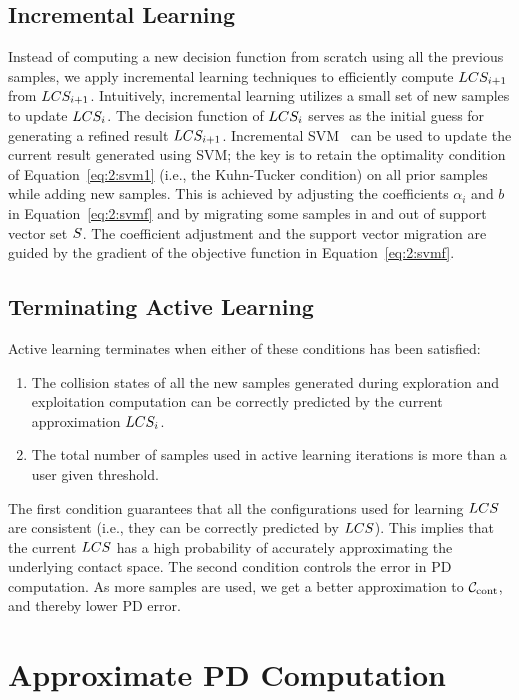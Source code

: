 \subsection{Incremental Learning}
\label{sec:2:incremental_learning}
Instead of computing a new decision function
from scratch using all the previous samples, we apply incremental
learning techniques to efficiently compute $LCS_{i+1}$ from
$LCS_{i+1}$. Intuitively, incremental learning utilizes a small set
of new samples to update $LCS_i$. The decision function of $LCS_i$
serves as the initial guess for generating a refined result
$LCS_{i+1}$. Incremental SVM~\cite{Karasuyama:2009:MID} can be used to update
the current result generated using SVM; the key is to retain the optimality condition of Equation~\ref{eq:2:svm1} (i.e., the Kuhn-Tucker condition) on all prior samples while adding new samples. This is achieved by adjusting the coefficients $\alpha_i$ and $b$ in Equation~\ref{eq:2:svmf} and by migrating some samples
in and out of support vector set $S$. The coefficient adjustment and the support vector migration are guided by the gradient of the objective function in Equation~\ref{eq:2:svmf}.

\subsection{Terminating Active Learning}
Active learning terminates when either of these conditions has been satisfied:
\begin{enumerate}
    \item The collision states of all the new samples generated during
exploration and exploitation computation can be correctly predicted by the
current approximation $LCS_i$.
    \item The total number of samples used in active learning iterations is more than a user given threshold.
   \end{enumerate}
The first condition guarantees that all the configurations used for learning $LCS$ are consistent (i.e., they can be correctly predicted by $LCS$). This implies that the current $LCS$ has a high probability of accurately approximating the underlying contact space.
The second condition controls the error in PD computation. As more samples are used, we get a better approximation to $\mathcal C_\text{cont}$, and thereby lower PD error.


\section{Approximate PD Computation}
\label{sec:2:approxPD}

